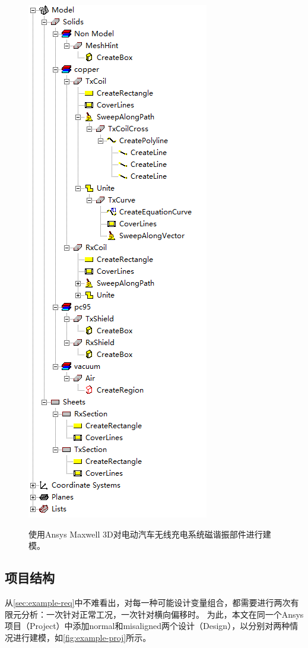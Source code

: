 \documentclass[index]{subfiles}
\begin{document}
\begin{figure}[h]
  \hspace{1em}
    {\includegraphics{./figures/example-model.png}}
  \caption[仿真文件的结构]{使用Ansys Maxwell 3D对电动汽车无线充电系统磁谐振部件进行建模。}
\end{figure}

\subsection{项目结构}
从\cref{sec:example-req}中不难看出，对每一种可能设计变量组合，都需要进行两次有限元分析：一次针对正常工况，一次针对横向偏移时。
为此，本文在同一个Ansys项目（Project）中添加normal和misaligned两个设计（Design），以分别对两种情况进行建模，如\cref{fig:example-proj}所示。
\end{document}
